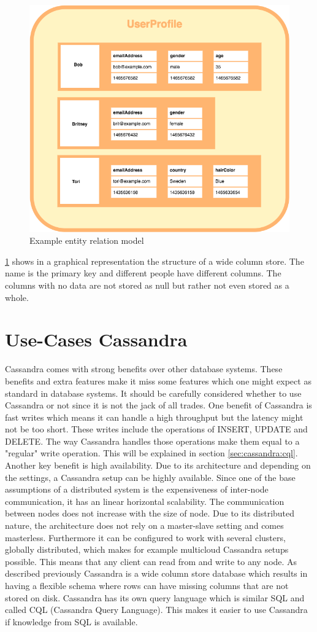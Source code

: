 \begin{figure}[H]
    \centering
    \includegraphics[width=0.75\columnwidth]{img/wide_column_store.png}
    \caption{Example entity relation model \autocite{wideColumnGraphic}}
    \label{fig:cassandra:wide_column}
\end{figure}

\ref{fig:cassandra:wide_column} shows in a graphical representation the structure of a wide column store. The name is the primary key and different people have different columns. The columns with no data are not stored as null but rather not even stored as a whole. 

\section{Use-Cases Cassandra}
Cassandra comes with strong benefits over other database systems. These benefits and extra features make it miss some features which one might expect as standard in database systems.
It should be carefully considered whether to use Cassandra or not since it is not the jack of all trades.
One benefit of Cassandra is fast writes which means it can handle a high throughput but the latency might not be too short. These writes include the operations of {INSERT}, {UPDATE} and {DELETE}.
The way Cassandra handles those operations make them equal to a "regular" write operation. This will be explained in section \ref{sec:cassandra:cql}. Another key benefit is high availability. Due to its architecture and depending on the settings, a Cassandra setup can be highly available. Since one of the base assumptions of a distributed system is the expensiveness of inter-node communication, it has an linear horizontal scalability.
The communication between nodes does not increase with the size of node. Due to its distributed nature, the architecture does not rely on a master-slave setting and comes masterless.
Furthermore it can be configured to work with several clusters, globally distributed, which makes for example multicloud Cassandra setups possible.
This means that any client can read from and write to any node. As described previously Cassandra is a wide column store database which results in having a flexible schema where rows can have missing columns that are not stored on disk.
Cassandra has its own query language which is similar SQL and called CQL (Cassandra Query Language). This makes it easier to use Cassandra if knowledge from SQL is available.

